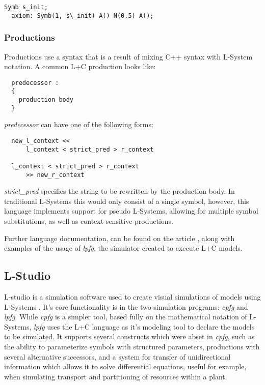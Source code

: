 \documentclass{acmtog}
\begin{document}
\begin{lstlisting}[label={lst:axiom}]
  Symb s_init;
  axiom: Symb(1, s\_init) A() N(0.5) A();
\end{lstlisting}

\subsubsection{Productions}
\label{subsubsec:productions}

Productions use a syntax that is a result of mixing C++ syntax with L-System notation. A common L+C production looks like:

\begin{lstlisting}
  predecessor :
  {
    production_body
  }
\end{lstlisting}

\emph{predecessor} can have one of the following forms:

\begin{lstlisting}
  new_l_context <<
      l_context < strict_pred > r_context

  l_context < strict_pred > r_context
      >> new_r_context
\end{lstlisting}

\emph{strict\_pred} specifies the string to be rewritten by the production body. In traditional L-Systems this would only consist of a single symbol, however, this language implements support for pseudo L-Systems, allowing for multiple symbol substitutions, as well as context-sensitive productions.

Further language documentation, can be found on the article \cite{karwowski2003design}, along with examples of the usage of \emph{lpfg}, the simulator created to execute L+C models.

\subsection{L-Studio}
\label{subsec:lstudio}

L-studio is a simulation software used to create visual simulations of models using L-Systems \cite{karwowski2004system}.
It's core functionality is in the two simulation programs: \emph{cpfg} and \emph{lpfg}. While \emph{cpfg} is a simpler tool, based fully on the mathematical notation of L-Systems, \emph{lpfg} uses the L+C language as it's modeling tool to declare the models to be simulated. It supports several constructs which were abset in \emph{cpfg}, such as the ability to parameterize symbols with structured parameters, productions with several alternative successors, and a system for transfer of unidirectional information which allows it to solve differential equations, useful for example, when simulating transport and partitioning of resources within a plant.
\end{document}
